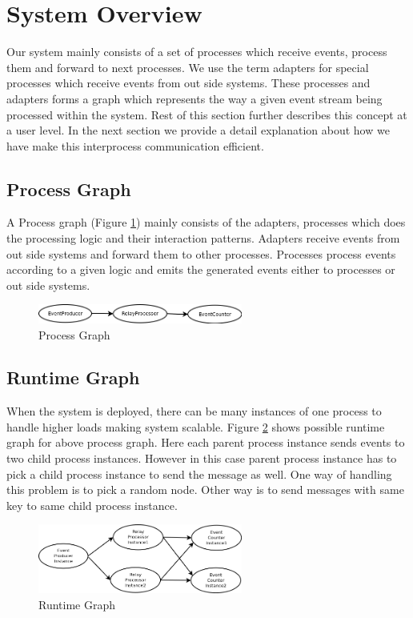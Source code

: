 \section{System Overview}
Our system mainly consists of a set of processes which receive events, process them and forward to next processes. We use the term adapters for special processes which receive events from out side systems. These processes and adapters forms a graph which represents the way a given event stream being processed within the system. Rest of this section further describes this concept at a user level. In the next section we provide a detail explanation about how we have make this interprocess communication efficient.
\subsection{Process Graph}
A Process graph (Figure \ref{processgraph}) mainly consists of the adapters, processes which does the processing logic and their interaction patterns. Adapters receive events from out side systems and forward them to other processes. Processes process events according to a given logic and emits the generated events either to processes or out side systems. 

\begin{figure}
        \centering
        \includegraphics[width=0.6\textwidth]{processgraph.png}
        \caption{Process Graph}
        \label{processgraph}
\end{figure}

\subsection{Runtime Graph}
When the system is deployed, there can be many instances of one process to handle higher loads making system scalable. Figure \ref{runtimegraph} shows possible runtime graph for above process graph. Here each parent process instance sends events to two child process instances. However in this case parent process instance has to pick a child process instance to send the message as well. One way of handling this problem is to pick a random node. Other way is to send messages with same key to same child process instance. 

\begin{figure}
        \centering
        \includegraphics[width=0.6\textwidth]{runtimegraph.png}
        \caption{Runtime Graph}
        \label{runtimegraph}
\end{figure}

